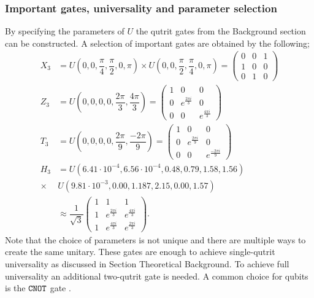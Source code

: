\subsubsection{Important gates, universality and parameter selection}
By specifying the parameters of $U$ the qutrit gates from the Background section can be constructed. A selection of important gates are obtained by the following;
\begin{equation}
\begin{aligned}
X_3 &= U(0,0,\dfrac{\pi}{4},\dfrac{\pi}{2},0,\pi)\times U(0,0,\dfrac{\pi}{2},\dfrac{\pi}{4},0,\pi) 
= \begin{pmatrix}
0&0&1
\\
1&0&0
\\
0&1&0
\end{pmatrix}
\\ 
Z_3 &= U(0,0,0,0,\dfrac{2\pi}{3},\dfrac{4\pi}{3})
= \begin{pmatrix}
1&0&0
\\
0&e^{\frac{2\pi i}{3}}&0
\\
0&0&e^{\frac{4\pi i}{3}}
\end{pmatrix}
\\
T_3 &= U(0,0,0,0,\dfrac{2\pi}{9},\dfrac{-2\pi}{9})
= \begin{pmatrix}
1&0&0
\\
0&e^{\frac{2\pi i}{9}}&0
\\
0&0&e^{\frac{-2\pi i}{9}}
\end{pmatrix}
\\
H_3 &= U(6.41\cdot 10^{-4}, 6.56\cdot 10^{-4}, 0.48, 0.79, 1.58, 1.56)\\ \times &U(9.81\cdot 10^{-3}, 0.00, 1.187, 2.15, 0.00, 1.57)\\
&\approx \dfrac{1}{\sqrt{3}}\begin{pmatrix}
1&1&1
\\
1&e^{\frac{2\pi i}{3}}&e^{\frac{4\pi i}{3}}
\\
1&e^{\frac{4\pi i}{3}}&e^{\frac{2\pi i}{3}}
\end{pmatrix}.
\end{aligned}
\end{equation}
Note that the choice of parameters is not unique and there are multiple ways to create the same unitary. These gates are enough to achieve single-qutrit universality as discussed in Section Theoretical Background. To achieve full universality an additional two-qutrit gate is needed. A common choice for qubits is the ${\tt CNOT}$ gate \cite{qudit}.

